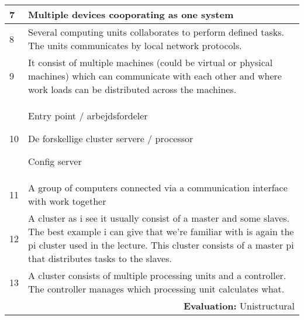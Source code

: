 \begin{longtable}{|p{0.3cm}|p{14.7cm}|}
7 & Multiple devices cooporating as one system \\ \hline

8 & Several computing units collaborates to perform defined tasks. The units communicates by local network protocols. \\ \hline

9 & It consist of multiple machines (could be virtual or physical machines) which can communicate with each other and where work loads can be distributed across the machines. \\ \hline

10 & Entry point / arbejdsfordeler

\noindent De forskellige cluster servere / processor

\noindent Config server \\ \hline
    
11 & A group of computers connected via a communication interface with work together \\ \hline

12 & A cluster as i see it usually consist of a master and some slaves. The best example i can give that we're familiar with is again the pi cluster used in the lecture. This cluster consists of a master pi that distributes tasks to the slaves. \\ \hline

13 & A cluster consists of multiple processing units and a controller. The controller manages which processing unit calculates what. \\ \hline

\multicolumn{2}{r}{\textbf{Evaluation:} Unistructural} \\ 
\end{longtable}
\normalsize

